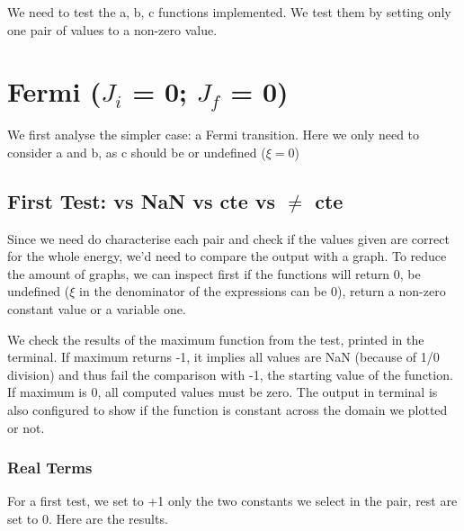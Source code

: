 \documentclass[twocolumn]{article}
\title{}
\author{}
\begin{document}
\maketitle

We need to test the a, b, c functions implemented. We test them by setting only one pair of values to a non-zero value.

\section{Fermi ($J_i$ = 0; $J_f$ = 0)}

We first analyse the simpler case: a Fermi transition. Here we only need to consider a and b, as c should be   or undefined ($\xi = 0$)

\subsection{First Test:   vs NaN vs cte  vs $\neq$ cte}

Since we need do characterise each pair and check if the values given are correct for the whole energy, we'd need to compare the output with a graph. To reduce the amount of graphs, we can inspect first if the functions will return 0, be undefined ($\xi$ in the denominator of the expressions can be 0), return a non-zero constant value or a variable one. 

We check the results of the maximum function from the test, printed in the terminal. If maximum returns -1, it implies all values are NaN (because of 1/0 division) and thus fail the comparison with -1, the starting value of the function. If maximum is 0, all computed values must be zero. The output in terminal is also configured to show if the function is constant across the domain we plotted or not.

\subsubsection{Real Terms}

For a first test, we set to +1 only the two constants we select in the pair, rest are set to 0. Here are the results.
\end{document}
